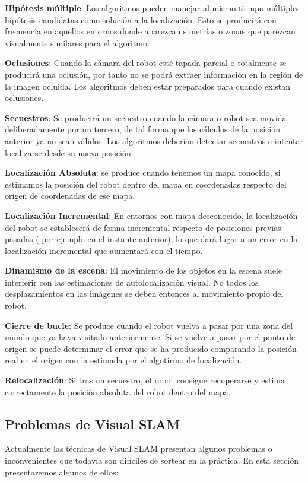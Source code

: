 \textbf{Hipótesis múltiple}: Los algoritmos pueden manejar al mismo tiempo múltiples hipótesis candidatas como solución a la localización. Esto se producirá con frecuencia en aquellos entornos donde aparezcan simetrías o zonas que parezcan visualmente similares para el algoritmo.

\textbf{Oclusiones}: Cuando la cámara del robot esté tapada parcial o totalmente se producirá una oclusión, por tanto no se podrá extraer información en la región de la imagen ocluida. Los algoritmos deben estar preparados para cuando existan oclusiones.

\textbf{Secuestros}: Se producirá un secuestro cuando la cámara o robot sea movida deliberadamente por un tercero, de tal forma que los cálculos de la posición anterior ya no sean válidos. Los algoritmos deberían detectar secuestros e intentar localizarse desde su nueva posición.

\textbf{Localización Absoluta}: se produce cuando tenemos un mapa conocido, si estimamos la posición del robot dentro del mapa en coordenadas respecto del origen de coordenadas de ese mapa.

\textbf{Localización Incremental}:  En entornos con mapa desconocido, la localización del robot se establecerá de forma incremental respecto de posiciones previas pasadas ( por ejemplo en el instante anterior), lo que dará lugar a un error en la localización incremental que aumentará con el tiempo.

\textbf{Dinamismo de la escena}: El movimiento de los objetos en la escena suele interferir con las estimaciones de autolocalización visual. No todos los desplazamientos en las imágenes se deben entonces al movimiento propio del robot.

\textbf{Cierre de bucle}: Se produce cuando el robot vuelva a pasar por una zona del mundo que ya haya visitado anteriormente. Si se vuelve a pasar por el punto de origen se puede determinar el error que se ha producido comparando la posición real en el origen con la estimada por el algotirmo de localización.

\textbf{Relocalización}: Si tras un secuestro, el robot consigue recuperarse y estima correctamente la posición absoluta del robot dentro del mapa.


\subsection{Problemas de Visual SLAM} \label{s:problemavlsam}

Actualmente las técnicas de Visual SLAM presentan algunos problemas o inconvenientes que todavía son difíciles de sortear en la práctica. En esta sección presentaremos algunos de ellos:

